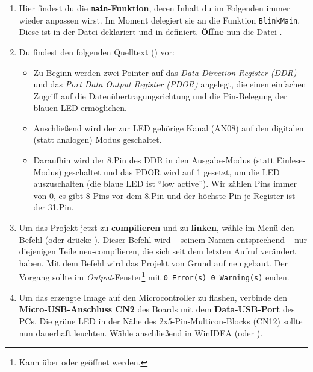 \begin{enumerate}
\item
Hier findest du die \textbf{\lstinline|main|-Funktion}, deren Inhalt du im Folgenden immer wieder anpassen wirst.
Im Moment delegiert sie an die Funktion \lstinline|BlinkMain|.
Diese ist in der Datei  deklariert und in  definiert.
\textbf{Öffne} nun die Datei \textbf{}.

\item 
Du findest den folgenden Quelltext () vor:
%
\begin{itemize}
\item 
Zu Beginn werden zwei Pointer auf das \emph{Data Direction Register (DDR)} und das \emph{Port Data Output Register (PDOR)} angelegt, die einen einfachen Zugriff auf die Datenübertragungsrichtung und die Pin-Belegung der blauen LED ermöglichen.

\item 
Anschließend wird der zur LED gehörige Kanal (AN08) auf den digitalen (statt analogen) Modus geschaltet.

\item 
Daraufhin wird der 8.\;Pin des DDR in den Ausgabe-Modus (statt Einlese-Modus) geschaltet und das PDOR wird auf 1 gesetzt, um die LED auszuschalten (\dasheisst die blaue LED ist \enquote{low active}).
Wir zählen Pins immer von 0, \dasheisst es gibt 8 Pins vor dem 8.\;Pin und der höchste Pin je Register ist der 31.\;Pin.
\end{itemize}

\item 
Um das Projekt jetzt zu \textbf{compilieren} und zu \textbf{linken}, wähle im Menü  den Befehl  (oder drücke ).
Dieser Befehl wird -- seinem Namen entsprechend -- nur diejenigen Teile neu-compilieren, die sich seit dem letzten Aufruf verändert haben.
Mit dem Befehl  wird das Projekt von Grund auf neu gebaut.
Der Vorgang sollte im \emph{Output}-Fenster\footnote{Kann über  oder  geöffnet werden.} mit \texttt{0 Error(s)  0 Warning(s)} enden.

\item 
Um das erzeugte Image auf den Microcontroller zu flashen, verbinde den \textbf{Micro-USB-Anschluss CN2} des Boards mit dem \textbf{Data-USB-Port} des PCs.
Die grüne LED in der Nähe des 2x5-Pin-Multicon-Blocks (CN12) sollte nun dauerhaft leuchten.
Wähle anschließend in WinIDEA \textbf{} (oder ).



\end{enumerate}

